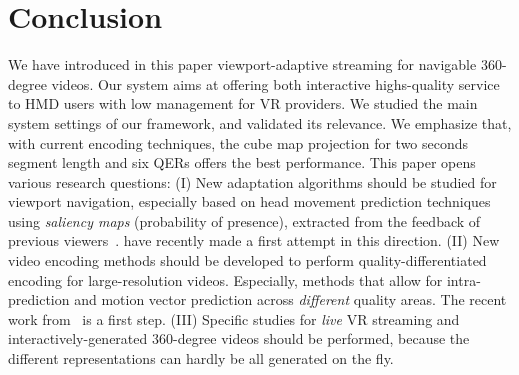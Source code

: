 \section{Conclusion}
\label{sec:conclusion}

We have introduced in this paper viewport-adaptive streaming for
navigable $360$-degree videos. Our system aims at offering both
interactive highs-quality service to \ac{HMD} users with low management
for \ac{VR} providers.
We studied the main system
settings of our framework, and validated its relevance.
We emphasize that, with current encoding techniques, the cube
map projection for two seconds segment length and six
\acp{QER} offers the best performance. This
paper opens various research questions:
(I) New adaptation algorithms should be studied for viewport navigation,
especially based on head movement prediction techniques using \emph{saliency maps} (probability of
presence), extracted from the feedback of
previous viewers~\cite{han2014spatial}. \citet{allthings} have recently made a first attempt in this
direction.
(II) New video encoding methods should be
developed to perform quality-differentiated encoding for
large-resolution videos. Especially, methods that allow for
intra-prediction and motion vector prediction across \emph{different} quality
areas. The recent work from~\citet{vishyArxiv} is a first step.
(III) Specific studies for \emph{live} \ac{VR} streaming
and interactively-generated $360$-degree videos should be performed,
because the different representations can hardly be all
generated on the fly.
